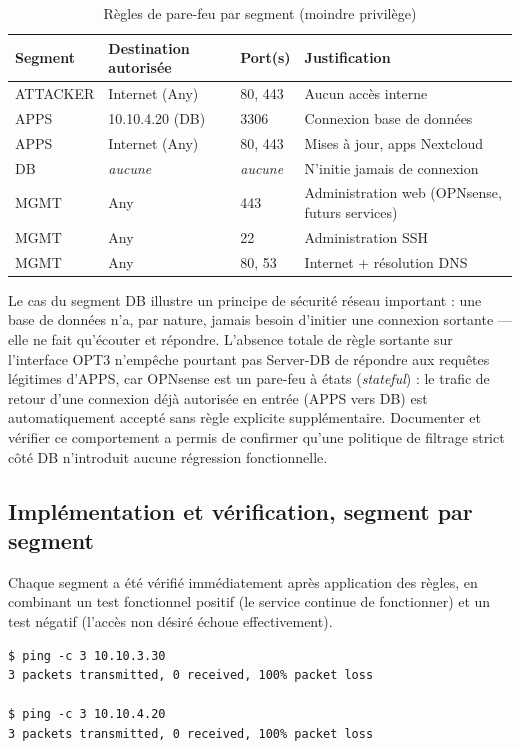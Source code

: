 \begin{table}[h]
\centering
\caption{Règles de pare-feu par segment (moindre privilège)}
\label{tab:regles}
\begin{tabular}{|l|l|l|l|}
\hline
\textbf{Segment} & \textbf{Destination autorisée} & \textbf{Port(s)} & \textbf{Justification} \\
\hline
ATTACKER & Internet (Any) & 80, 443 & Aucun accès interne \\
APPS & 10.10.4.20 (DB) & 3306 & Connexion base de données \\
APPS & Internet (Any) & 80, 443 & Mises à jour, apps Nextcloud \\
DB & \emph{aucune} & \emph{aucune} & N'initie jamais de connexion \\
MGMT & Any & 443 & Administration web (OPNsense, futurs services) \\
MGMT & Any & 22 & Administration SSH \\
MGMT & Any & 80, 53 & Internet + résolution DNS \\
\hline
\end{tabular}
\end{table}

Le cas du segment DB illustre un principe de sécurité réseau important :
une base de données n'a, par nature, jamais besoin d'initier une connexion
sortante — elle ne fait qu'écouter et répondre. L'absence totale de règle
sortante sur l'interface OPT3 n'empêche pourtant pas Server-DB de répondre
aux requêtes légitimes d'APPS, car OPNsense est un pare-feu à états
(\emph{stateful}) : le trafic de retour d'une connexion déjà autorisée en
entrée (APPS vers DB) est automatiquement accepté sans règle explicite
supplémentaire. Documenter et vérifier ce comportement a permis de
confirmer qu'une politique de filtrage strict côté DB n'introduit aucune
régression fonctionnelle.

\subsection{Implémentation et vérification, segment par segment}

Chaque segment a été vérifié immédiatement après application des règles,
en combinant un test fonctionnel positif (le service continue de
fonctionner) et un test négatif (l'accès non désiré échoue effectivement).

\begin{lstlisting}[caption={Vérification ATTACKER : aucun mouvement latéral}]
$ ping -c 3 10.10.3.30
3 packets transmitted, 0 received, 100% packet loss

$ ping -c 3 10.10.4.20
3 packets transmitted, 0 received, 100% packet loss
\end{lstlisting}

